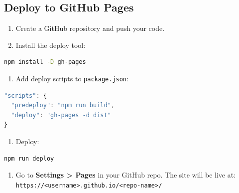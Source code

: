 \documentclass[11pt,a4paper]{article}
\begin{document}
\subsection{Deploy to GitHub Pages}

\begin{enumerate}[leftmargin=*, label=\textcolor{accent}{\arabic*.}]
    \item Create a GitHub repository and push your code.
    \item Install the deploy tool:
\end{enumerate}

\begin{codebox}[Terminal]
\begin{lstlisting}[language=bash]
npm install -D gh-pages
\end{lstlisting}
\end{codebox}

\begin{enumerate}[leftmargin=*, label=\textcolor{accent}{\arabic*.}, start=3]
    \item Add deploy scripts to \texttt{package.json}:
\end{enumerate}

\begin{codebox}
\begin{lstlisting}[language=JavaScript]
"scripts": {
  "predeploy": "npm run build",
  "deploy": "gh-pages -d dist"
}
\end{lstlisting}
\end{codebox}

\begin{enumerate}[leftmargin=*, label=\textcolor{accent}{\arabic*.}, start=4]
    \item Deploy:
\end{enumerate}

\begin{codebox}[Terminal]
\begin{lstlisting}[language=bash]
npm run deploy
\end{lstlisting}
\end{codebox}

\begin{enumerate}[leftmargin=*, label=\textcolor{accent}{\arabic*.}, start=5]
    \item Go to \textbf{Settings > Pages} in your GitHub repo.
          The site will be live at:
          \texttt{https://<username>.github.io/<repo-name>/}
\end{enumerate}
\end{document}
